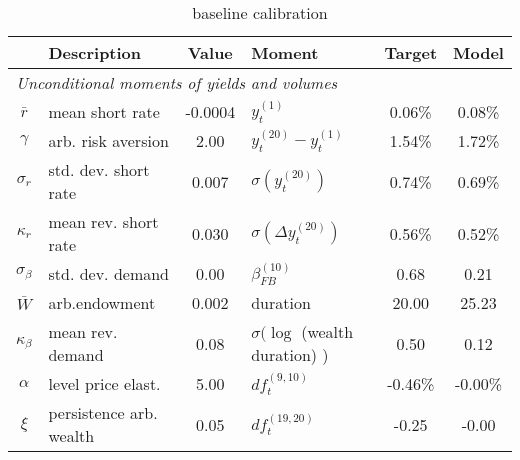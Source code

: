 \begin{table}[htbp]  
\centering  
\bgroup  
\def\arraystretch{1.25}  
\begin{tabular}{clclcc} \hline  
& Description & Value & Moment & Target & Model \\ \hline  
\multicolumn{6}{l}{\emph{Unconditional moments of yields and volumes}} \\  
$\bar{r}$  & mean short rate & -0.0004  & $y_{t}^{(1)}$ & 0.06\% & 0.08\%   \\ 
$\gamma$  & arb. risk aversion & 2.00  & $y_{t}^{(20)}-y_{t}^{(1)}$ & 1.54\% & 1.72\%   \\ 
$\sigma_r$ & std. dev. short rate & 0.007 & $\sigma ( y_{t}^{(20)} )$  & 0.74\% & 0.69\% \\ 
$\kappa_r$ & mean rev. short rate & 0.030 & $\sigma (\Delta y_{t}^{(20)})$ & 0.56\% & 0.52\% \\ 
$\sigma_{\beta}$ & std. dev. demand & 0.00 & $ \beta^{(10)}_{FB} $ & 0.68 & 0.21 \\ 
$\bar{W}$ & arb.endowment & 0.002 & duration & 20.00 & 25.23 \\ 
$\kappa_{\beta}$ & mean rev. demand & 0.08 & $\sigma (\log $ (wealth duration) ) & 0.50 & 0.12 \\ 
$\alpha$ & level price elast. & 5.00 & $ df_t^{(9,10)} $ & -0.46\% & -0.00\% \\ 
$\xi$ & persistence arb. wealth & 0.05 & $ df_t^{(19,20)} $ & -0.25 & -0.00 \\ 
\end{tabular} 
\egroup 
\caption{baseline calibration} 
\label{tab:cal} 
\end{table} 
